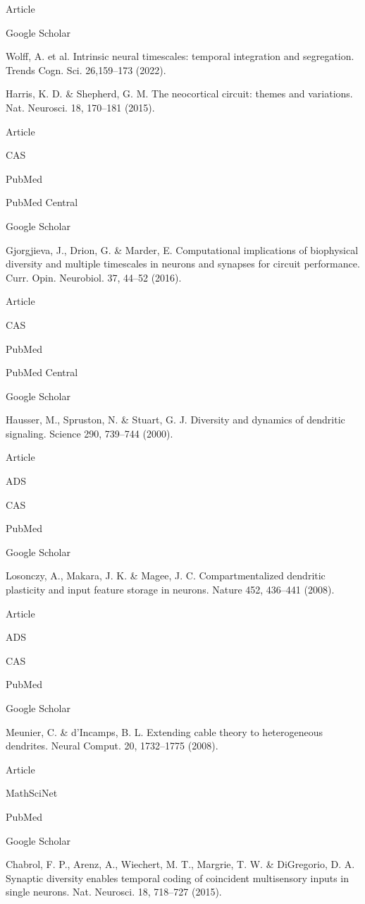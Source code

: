 Article
 
Google Scholar
 

Wolff, A. et al. Intrinsic neural timescales: temporal integration and segregation. Trends Cogn. Sci. 26,159–173 (2022).

Harris, K. D. & Shepherd, G. M. The neocortical circuit: themes and variations. Nat. Neurosci. 18, 170–181 (2015).

Article
 
CAS
 
PubMed
 
PubMed Central
 
Google Scholar
 

Gjorgjieva, J., Drion, G. & Marder, E. Computational implications of biophysical diversity and multiple timescales in neurons and synapses for circuit performance. Curr. Opin. Neurobiol. 37, 44–52 (2016).

Article
 
CAS
 
PubMed
 
PubMed Central
 
Google Scholar
 

Hausser, M., Spruston, N. & Stuart, G. J. Diversity and dynamics of dendritic signaling. Science 290, 739–744 (2000).

Article
 
ADS
 
CAS
 
PubMed
 
Google Scholar
 

Losonczy, A., Makara, J. K. & Magee, J. C. Compartmentalized dendritic plasticity and input feature storage in neurons. Nature 452, 436–441 (2008).

Article
 
ADS
 
CAS
 
PubMed
 
Google Scholar
 

Meunier, C. & d’Incamps, B. L. Extending cable theory to heterogeneous dendrites. Neural Comput. 20, 1732–1775 (2008).

Article
 
MathSciNet
 
PubMed
 
Google Scholar
 

Chabrol, F. P., Arenz, A., Wiechert, M. T., Margrie, T. W. & DiGregorio, D. A. Synaptic diversity enables temporal coding of coincident multisensory inputs in single neurons. Nat. Neurosci. 18, 718–727 (2015).

